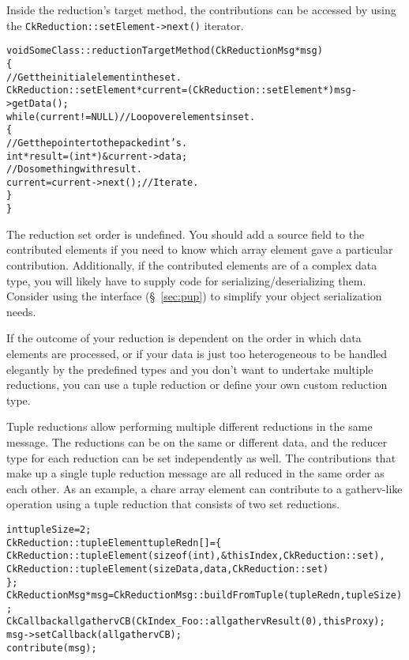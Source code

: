 Inside the reduction's target method, the contributions can be accessed by using
the \texttt{CkReduction::setElement->next()} iterator.

\begin{alltt}
void SomeClass::reductionTargetMethod (CkReductionMsg *msg)
\{
  // Get the initial element in the set.
  CkReduction::setElement *current = (CkReduction::setElement*) msg->getData();
  while(current != NULL) // Loop over elements in set.
  \{
    // Get the pointer to the packed int's.
    int *result = (int*) &current->data;
    // Do something with result.
    current = current->next(); // Iterate.
  \}
\}
\end{alltt}

The reduction set order is undefined.  You should add a source field to the
contributed elements if you need to know which array element gave a particular
contribution.  Additionally, if the contributed elements are of a complex 
data type, you will likely have to supply code for 
serializing/deserializing them.
Consider using the 
interface (\S~\ref{sec:pup}) to simplify your object serialization
needs.

If the outcome of your reduction is dependent on the order in which 
data elements are processed, or if your data is just too
heterogeneous to be handled elegantly by the predefined types and you
don't want to undertake multiple reductions, you can use a tuple
reduction or define your own custom reduction type.

Tuple reductions allow performing multiple different reductions in the
same message. The reductions can be on the same or different data, and
the reducer type for each reduction can be set independently as well.
The contributions that make up a single tuple reduction message are all
reduced in the same order as each other. As an example, a chare array
element can contribute to a gatherv-like operation using a tuple reduction
that consists of two set reductions.

\begin{alltt}
int tupleSize = 2;
CkReduction::tupleElement tupleRedn[] = \{
  CkReduction::tupleElement(sizeof(int), \&thisIndex, CkReduction::set),
  CkReduction::tupleElement(sizeData, data, CkReduction::set)
\};
CkReductionMsg* msg = CkReductionMsg::buildFromTuple(tupleRedn, tupleSize);
CkCallback allgathervCB(CkIndex\_Foo::allgathervResult(0), thisProxy);
msg->setCallback(allgathervCB);
contribute(msg);
\end{alltt}

